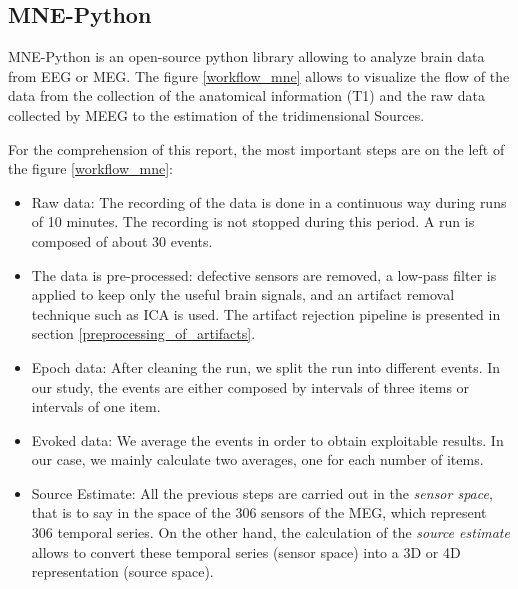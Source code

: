 \subsection{MNE-Python}

MNE-Python \cite{GramfortEtAl2013a} is an open-source python library allowing to analyze brain data from EEG or MEG. The figure \ref{workflow_mne} allows to visualize the flow of the data from the collection of the anatomical information (T1) and the raw data collected by MEEG to the estimation of the tridimensional Sources.

For the comprehension of this report, the most important steps are on the left of the figure \ref{workflow_mne}:

\begin{itemize}
   \item Raw data: The recording of the data is done in a continuous way during runs of 10 minutes. The recording is not stopped during this period. A run is composed of about 30 events.
   \item The data is pre-processed: defective sensors are removed, a low-pass filter is applied to keep only the useful brain signals, and an artifact removal technique such as ICA is used. The artifact rejection pipeline is presented in section \ref{preprocessing_of_artifacts}.
   \item Epoch data: After cleaning the run, we split the run into different events. In our study, the events are either composed by intervals of three items or intervals of one item.
   \item Evoked data: We average the events in order to obtain exploitable results. In our case, we mainly calculate two averages, one for each number of items.
   \item Source Estimate: All the previous steps are carried out in the \textit{sensor space}, that is to say in the space of the 306 sensors of the MEG, which represent 306 temporal series. On the other hand, the calculation of the \textit{source estimate} allows to convert these temporal series (sensor space) into a 3D or 4D representation (source space).
\end{itemize}

